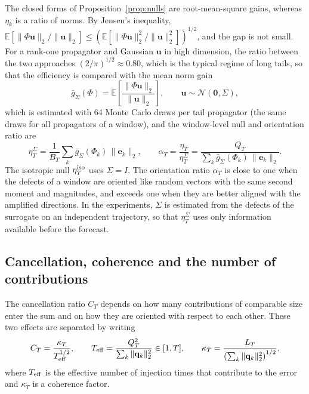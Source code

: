 The closed forms of Proposition~\ref{prop:nulls} are root-mean-square gains, whereas $\eta_k$ is a ratio of norms. By Jensen's inequality, $\mathbb E[\|\Phi\mathbf u\|_2/\|\mathbf u\|_2]\le(\mathbb E[\|\Phi\mathbf u\|_2^2/\|\mathbf u\|_2^2])^{1/2}$, and the gap is not small. For a rank-one propagator and Gaussian $\mathbf u$ in high dimension, the ratio between the two approaches $(2/\pi)^{1/2}\approx0.80$, which is the typical regime of long tails, so that the efficiency is compared with the mean norm gain
\begin{equation}
  \bar g_\Sigma(\Phi)=\mathbb E\left[\frac{\|\Phi\mathbf u\|_2}{\|\mathbf u\|_2}\right],
  \qquad \mathbf u\sim\mathcal N(\mathbf 0,\Sigma),
  \label{eq:mean_gain}
\end{equation}
which is estimated with 64 Monte Carlo draws per tail propagator (the same draws for all propagators of a window), and the window-level null and orientation ratio are
\begin{equation}
  \eta^{\Sigma}_T=\frac{1}{B_T}\sum_k \bar g_\Sigma(\Phi_k)\,\|\mathbf e_k\|_2,
  \qquad
  \alpha_T=\frac{\eta_T}{\eta^{\Sigma}_T}=\frac{Q_T}{\sum_k\bar g_\Sigma(\Phi_k)\,\|\mathbf e_k\|_2}.
  \label{eq:alpha}
\end{equation}
The isotropic null $\eta^{\rm iso}_T$ uses $\Sigma=I$. The orientation ratio $\alpha_T$ is close to one when the defects of a window are oriented like random vectors with the same second moment and magnitudes, and exceeds one when they are better aligned with the amplified directions. In the experiments, $\Sigma$ is estimated from the defects of the surrogate on an independent trajectory, so that $\eta^\Sigma_T$ uses only information available before the forecast.

\subsection{Cancellation, coherence and the number of contributions}

The cancellation ratio $C_T$ depends on how many contributions of comparable size enter the sum and on how they are oriented with respect to each other. These two effects are separated by writing
\begin{equation}
  C_T=\frac{\kappa_T}{T_{\rm eff}^{1/2}},
  \qquad
  T_{\rm eff}=\frac{Q_T^2}{\sum_k\|\mathbf q_k\|_2^2}\in[1,T],
  \qquad
  \kappa_T=\frac{L_T}{\left(\sum_k\|\mathbf q_k\|_2^2\right)^{1/2}},
  \label{eq:coherence}
\end{equation}
where $T_{\rm eff}$ is the effective number of injection times that contribute to the error and $\kappa_T$ is a coherence factor.


